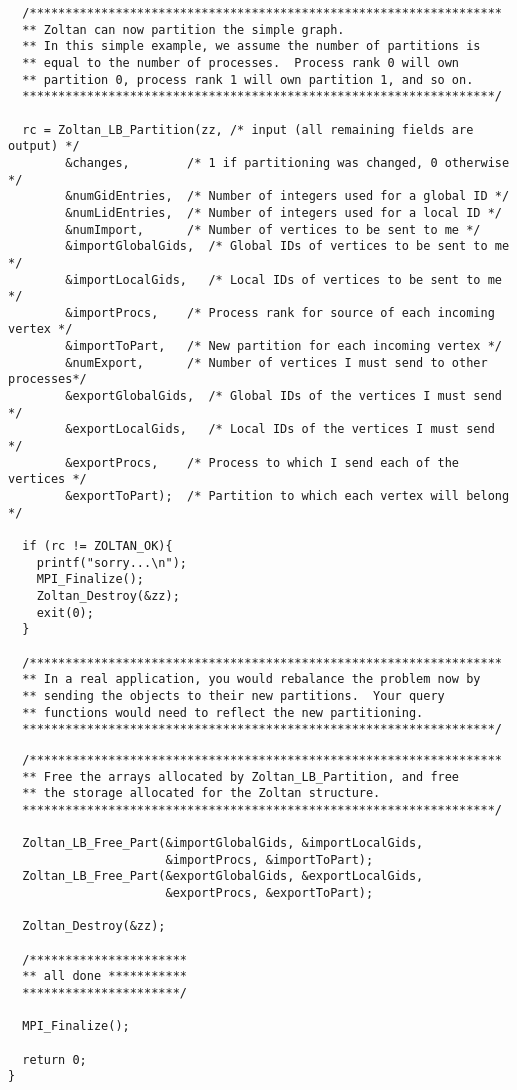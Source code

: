 \clearpage
\begin{flushleft}
\begin{verbatim}
  /******************************************************************
  ** Zoltan can now partition the simple graph.
  ** In this simple example, we assume the number of partitions is
  ** equal to the number of processes.  Process rank 0 will own
  ** partition 0, process rank 1 will own partition 1, and so on.
  ******************************************************************/

  rc = Zoltan_LB_Partition(zz, /* input (all remaining fields are output) */
        &changes,        /* 1 if partitioning was changed, 0 otherwise */ 
        &numGidEntries,  /* Number of integers used for a global ID */
        &numLidEntries,  /* Number of integers used for a local ID */
        &numImport,      /* Number of vertices to be sent to me */
        &importGlobalGids,  /* Global IDs of vertices to be sent to me */
        &importLocalGids,   /* Local IDs of vertices to be sent to me */
        &importProcs,    /* Process rank for source of each incoming vertex */
        &importToPart,   /* New partition for each incoming vertex */
        &numExport,      /* Number of vertices I must send to other processes*/
        &exportGlobalGids,  /* Global IDs of the vertices I must send */
        &exportLocalGids,   /* Local IDs of the vertices I must send */
        &exportProcs,    /* Process to which I send each of the vertices */
        &exportToPart);  /* Partition to which each vertex will belong */

  if (rc != ZOLTAN_OK){
    printf("sorry...\n");
    MPI_Finalize();
    Zoltan_Destroy(&zz);
    exit(0);
  }

  /******************************************************************
  ** In a real application, you would rebalance the problem now by
  ** sending the objects to their new partitions.  Your query 
  ** functions would need to reflect the new partitioning.
  ******************************************************************/
\end{verbatim}
\end{flushleft}

\clearpage
\begin{flushleft}
\begin{verbatim}
  /******************************************************************
  ** Free the arrays allocated by Zoltan_LB_Partition, and free
  ** the storage allocated for the Zoltan structure.
  ******************************************************************/

  Zoltan_LB_Free_Part(&importGlobalGids, &importLocalGids, 
                      &importProcs, &importToPart);
  Zoltan_LB_Free_Part(&exportGlobalGids, &exportLocalGids, 
                      &exportProcs, &exportToPart);

  Zoltan_Destroy(&zz);

  /**********************
  ** all done ***********
  **********************/

  MPI_Finalize();

  return 0;
}
\end{verbatim}
\end{flushleft}

